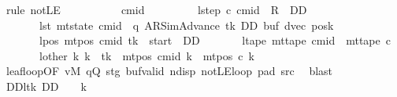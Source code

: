 \begin{isabellebody}
\ {\isacharparenleft}{\kern0pt}rule\ notLE{\isacharparenright}{\kern0pt}\isanewline
\ \ \ \ \isamarkupfalse%
\isanewline
\ \ \ \ \isamarkupfalse%
\ cmid\ \isanewline
\ \ \ \ \ \ \ \ lstep{\isacharcolon}{\kern0pt}\ {\isachardoublequoteopen}{\isacharparenleft}{\kern0pt}c{}{\isacharcomma}{\kern0pt}\ cmid{\isacharparenright}{\kern0pt}\ {\isasymin}\ {\isacharquery}{\kern0pt}R\ {\isacharcircum}{\kern0pt}{\isacharcircum}{\kern0pt}\ DD{\isachardoublequoteclose}\isanewline
\ \ \ \ \ \ \ lst{\isacharcolon}{\kern0pt}\ {\isachardoublequoteopen}mt{\isacharunderscore}{\kern0pt}state\ cmid\ {\isacharequal}{\kern0pt}\ {\isacharparenleft}{\kern0pt}q{\isacharcomma}{\kern0pt}\ AR{\isacharunderscore}{\kern0pt}SimAdvance{\isacharcomma}{\kern0pt}\ tk{\isacharcomma}{\kern0pt}\ DD{\isacharcomma}{\kern0pt}\ buf{\isacharcomma}{\kern0pt}\ dvec{\isacharcomma}{\kern0pt}\ posk{\isacharparenright}{\kern0pt}{\isachardoublequoteclose}\isanewline
\ \ \ \ \ \ \ lpos{\isacharcolon}{\kern0pt}\ {\isachardoublequoteopen}mt{\isacharunderscore}{\kern0pt}pos\ cmid\ tk\ {\isacharequal}{\kern0pt}\ {\isacharquery}{\kern0pt}start\ {\isacharminus}{\kern0pt}\ DD{\isachardoublequoteclose}\isanewline
\ \ \ \ \ \ \ ltape{\isacharcolon}{\kern0pt}\ {\isachardoublequoteopen}mt{\isacharunderscore}{\kern0pt}tape\ cmid\ {\isacharequal}{\kern0pt}\ mt{\isacharunderscore}{\kern0pt}tape\ c{}{\isachardoublequoteclose}\isanewline
\ \ \ \ \ \ \ lother{\isacharcolon}{\kern0pt}\ {\isachardoublequoteopen}{\isasymforall}k{\isacharprime}{\kern0pt}{\isachardot}{\kern0pt}\ k{\isacharprime}{\kern0pt}\ {\isasymnoteq}\ tk\ {\isasymlongrightarrow}\ mt{\isacharunderscore}{\kern0pt}pos\ cmid\ k{\isacharprime}{\kern0pt}\ {\isacharequal}{\kern0pt}\ mt{\isacharunderscore}{\kern0pt}pos\ c{}\ k{\isacharprime}{\kern0pt}{\isachardoublequoteclose}\isanewline
\ \ \ \ \ \ \isamarkupfalse%
\ leaf{\isacharunderscore}{\kern0pt}loop{\isacharbrackleft}{\kern0pt}OF\ vM\ qQ\ stg\ buf{\isacharunderscore}{\kern0pt}valid\ ndisp\ notLE{\isacharunderscore}{\kern0pt}loop\ pad{}\ src{}{\isacharbrackright}{\kern0pt}\ \isamarkupfalse%
\ blast\isanewline
\ \ \ \ \isamarkupfalse%
\ DD{\isacharunderscore}{\kern0pt}lt{}k{\isacharcolon}{\kern0pt}\ {\isachardoublequoteopen}DD\ {\isacharless}{\kern0pt}\ {}\ {\isacharasterisk}{\kern0pt}\ {\isacharquery}{\kern0pt}k{\isachardoublequoteclose}\isanewline

\end{isabellebody}

